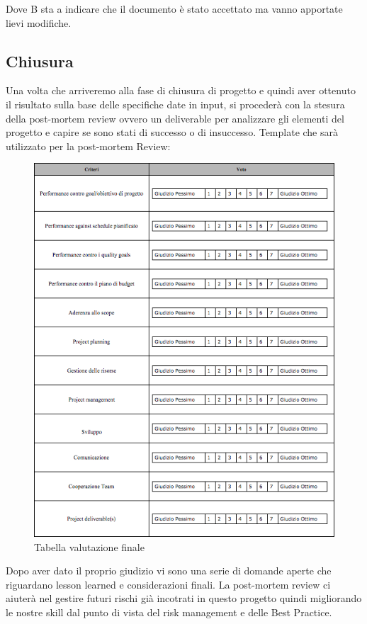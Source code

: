 Dove B sta a indicare che il documento è stato accettato ma vanno apportate lievi modifiche.

\subsection{Chiusura}
Una volta che arriveremo alla fase di chiusura di progetto e quindi aver ottenuto il risultato sulla base delle specifiche date in input, si procederà con la stesura della post-mortem review ovvero un deliverable per analizzare gli elementi del progetto e capire se sono stati di successo o di insuccesso. Template che sarà utilizzato per la post-mortem Review:\\

\begin{figure}[!h]
\centering
\includegraphics[scale=.6]{img/postmortem.png}
\caption{Tabella valutazione finale}
\end{figure}

Dopo aver dato il proprio giudizio vi sono una serie di domande aperte che riguardano lesson learned e considerazioni finali.
La post-mortem review ci aiuterà nel gestire futuri rischi già incotrati in questo progetto quindi migliorando le nostre skill dal punto di vista del risk management e delle Best Practice.
